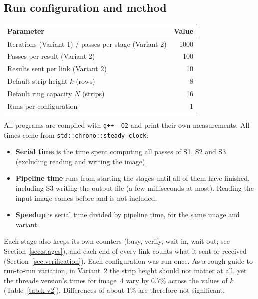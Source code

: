 \documentclass[11pt,a4paper]{article}
\newcommand{\cfgIterations}{1000}
\newcommand{\cfgK}{8}
\newcommand{\cfgRing}{16}
\newcommand{\cfgPasses}{100}
\newcommand{\cfgResults}{10}
\newcommand{\code}[1]{\texttt{#1}}
\begin{document}
\subsection{Run configuration and method}
\begin{center}
\begin{tabular}{lr}
\toprule
Parameter & Value \\
\midrule
Iterations (Variant 1) / passes per stage (Variant 2) & \cfgIterations \\
Passes per result (Variant 2) & \cfgPasses \\
Results sent per link (Variant 2) & \cfgResults \\
Default strip height $k$ (rows) & \cfgK \\
Default ring capacity $N$ (strips) & \cfgRing \\
Runs per configuration & 1 \\
\bottomrule
\end{tabular}
\end{center}
All programs are compiled with \code{g++ -O2} and print their own measurements. All times come
from \code{std::chrono::steady\_clock}:
\begin{itemize}
\item \textbf{Serial time} is the time spent computing all passes of S1, S2 and S3 (excluding
  reading and writing the image).
\item \textbf{Pipeline time} runs from starting the stages until all of them have finished,
  including S3 writing the output file (a few milliseconds at most). Reading the input image comes
  before and is not included.
\item \textbf{Speedup} is serial time divided by pipeline time, for the same image and variant.
\end{itemize}
Each stage also keeps its own counters (busy, verify, wait in, wait out; see
Section~\ref{sec:stages}), and each end of every link counts what it sent or received
(Section~\ref{sec:verification}). Each configuration was run once. As a rough guide to
run-to-run variation, in Variant~2 the strip height should not matter at all, yet the threads
version's times for image~4 vary by 0.7\% across the values of $k$ (Table~\ref{tab:k-v2}).
Differences of about 1\% are therefore not significant.
\end{document}
